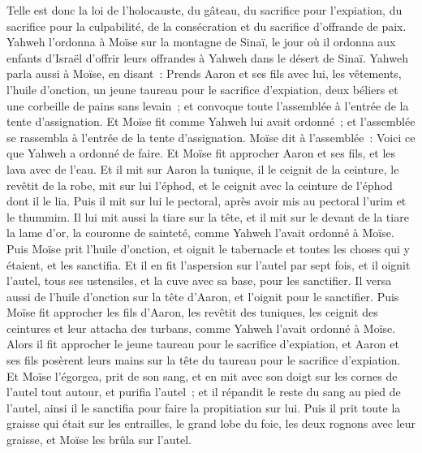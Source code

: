 \begin{multicols}{2}
Telle est donc la loi de l'holocauste, du gâteau, du sacrifice pour l'expiation, du sacrifice pour la culpabilité, de la consécration et du sacrifice d'offrande de paix.
Yahweh l'ordonna à Moïse sur la montagne de Sinaï, le jour où il ordonna aux enfants d'Israël d'offrir leurs offrandes à Yahweh dans le désert de Sinaï.
\VerseOne{}Yahweh parla aussi à Moïse, en disant~:
Prends Aaron et ses fils avec lui, les vêtements, l'huile d'onction, un jeune taureau pour le sacrifice d'expiation, deux béliers et une corbeille de pains sans levain~;
et convoque toute l'assemblée à l'entrée de la tente d'assignation.
Et Moïse fit comme Yahweh lui avait ordonné~; et l'assemblée se rassembla à l'entrée de la tente d'assignation.
Moïse dit à l'assemblée~: Voici ce que Yahweh a ordonné de faire.
Et Moïse fit approcher Aaron et ses fils, et les lava avec de l'eau.
Et il mit sur Aaron la tunique, il le ceignit de la ceinture, le revêtit de la robe, mit sur lui l'éphod, et le ceignit avec la ceinture de l'éphod dont il le lia.
Puis il mit sur lui le pectoral, après avoir mis au pectoral l'urim et le thummim.
Il lui mit aussi la tiare sur la tête, et il mit sur le devant de la tiare la lame d'or, la couronne de sainteté, comme Yahweh l'avait ordonné à Moïse.
Puis Moïse prit l'huile d'onction, et oignit le tabernacle et toutes les choses qui y étaient, et les sanctifia.
Et il en fit l'aspersion sur l'autel par sept fois, et il oignit l'autel, tous ses ustensiles, et la cuve avec sa base, pour les sanctifier.
Il versa aussi de l'huile d'onction sur la tête d'Aaron, et l'oignit pour le sanctifier.
Puis Moïse fit approcher les fils d'Aaron, les revêtit des tuniques, les ceignit des ceintures et leur attacha des turbans, comme Yahweh l'avait ordonné à Moïse.
Alors il fit approcher le jeune taureau pour le sacrifice d'expiation, et Aaron et ses fils posèrent leurs mains sur la tête du taureau pour le sacrifice d'expiation.
Et Moïse l'égorgea, prit de son sang, et en mit avec son doigt sur les cornes de l'autel tout autour, et purifia l'autel~; et il répandit le reste du sang au pied de l'autel, ainsi il le sanctifia pour faire la propitiation sur lui.
Puis il prit toute la graisse qui était sur les entrailles, le grand lobe du foie, les deux rognons avec leur graisse, et Moïse les brûla sur l'autel.

\end{multicols}
